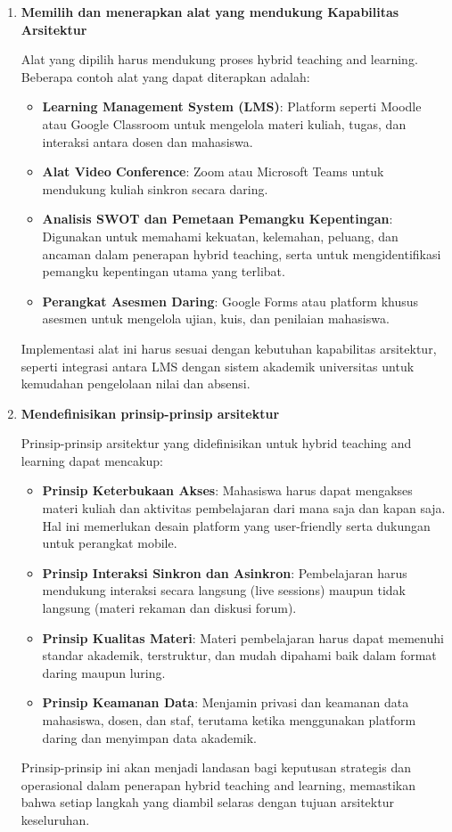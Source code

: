 \begin{enumerate}
	\item \textbf{Memilih dan menerapkan alat yang mendukung Kapabilitas Arsitektur}
	
	Alat yang dipilih harus mendukung proses hybrid teaching and learning. Beberapa contoh alat yang dapat diterapkan adalah:
	\begin{itemize}
		\item \textbf{Learning Management System (LMS)}: Platform seperti Moodle atau Google Classroom untuk mengelola materi kuliah, tugas, dan interaksi antara dosen dan mahasiswa.
		\item \textbf{Alat Video Conference}: Zoom atau Microsoft Teams untuk mendukung kuliah sinkron secara daring.
		\item \textbf{Analisis SWOT dan Pemetaan Pemangku Kepentingan}: Digunakan untuk memahami kekuatan, kelemahan, peluang, dan ancaman dalam penerapan hybrid teaching, serta untuk mengidentifikasi pemangku kepentingan utama yang terlibat.
		\item \textbf{Perangkat Asesmen Daring}: Google Forms atau platform khusus asesmen untuk mengelola ujian, kuis, dan penilaian mahasiswa.
	\end{itemize}
	
	Implementasi alat ini harus sesuai dengan kebutuhan kapabilitas arsitektur, seperti integrasi antara LMS dengan sistem akademik universitas untuk kemudahan pengelolaan nilai dan absensi.
	
	\item \textbf{Mendefinisikan prinsip-prinsip arsitektur}
	
	Prinsip-prinsip arsitektur yang didefinisikan untuk hybrid teaching and learning dapat mencakup:
	\begin{itemize}
		\item \textbf{Prinsip Keterbukaan Akses}: Mahasiswa harus dapat mengakses materi kuliah dan aktivitas pembelajaran dari mana saja dan kapan saja. Hal ini memerlukan desain platform yang user-friendly serta dukungan untuk perangkat mobile.
		\item \textbf{Prinsip Interaksi Sinkron dan Asinkron}: Pembelajaran harus mendukung interaksi secara langsung (live sessions) maupun tidak langsung (materi rekaman dan diskusi forum).
		\item \textbf{Prinsip Kualitas Materi}: Materi pembelajaran harus dapat memenuhi standar akademik, terstruktur, dan mudah dipahami baik dalam format daring maupun luring.
		\item \textbf{Prinsip Keamanan Data}: Menjamin privasi dan keamanan data mahasiswa, dosen, dan staf, terutama ketika menggunakan platform daring dan menyimpan data akademik.
	\end{itemize}
	
	Prinsip-prinsip ini akan menjadi landasan bagi keputusan strategis dan operasional dalam penerapan hybrid teaching and learning, memastikan bahwa setiap langkah yang diambil selaras dengan tujuan arsitektur keseluruhan.
\end{enumerate}



